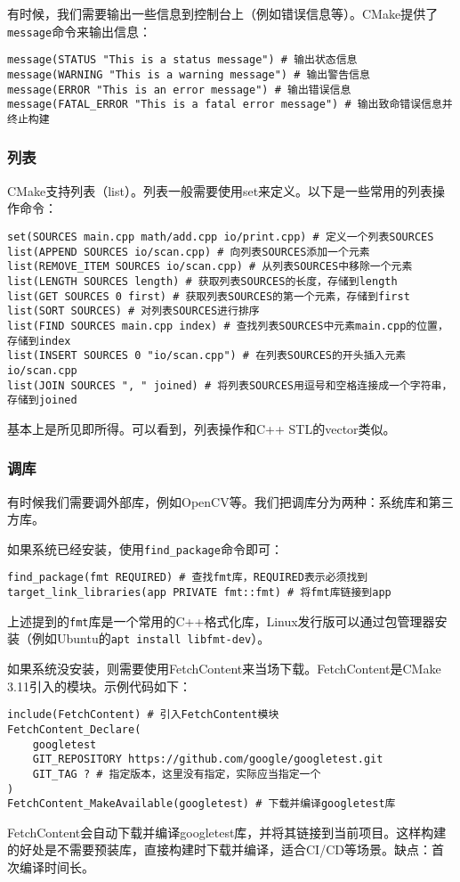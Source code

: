 \documentclass[../main.tex]{subfiles}
\begin{document}
有时候，我们需要输出一些信息到控制台上（例如错误信息等）。CMake提供了\texttt{message}命令来输出信息：
\begin{lstlisting}
message(STATUS "This is a status message") # 输出状态信息
message(WARNING "This is a warning message") # 输出警告信息
message(ERROR "This is an error message") # 输出错误信息
message(FATAL_ERROR "This is a fatal error message") # 输出致命错误信息并终止构建
\end{lstlisting}

\subsubsection{列表}

CMake支持列表（list）。列表一般需要使用set来定义。以下是一些常用的列表操作命令：
\begin{lstlisting}
set(SOURCES main.cpp math/add.cpp io/print.cpp) # 定义一个列表SOURCES
list(APPEND SOURCES io/scan.cpp) # 向列表SOURCES添加一个元素
list(REMOVE_ITEM SOURCES io/scan.cpp) # 从列表SOURCES中移除一个元素
list(LENGTH SOURCES length) # 获取列表SOURCES的长度，存储到length
list(GET SOURCES 0 first) # 获取列表SOURCES的第一个元素，存储到first
list(SORT SOURCES) # 对列表SOURCES进行排序
list(FIND SOURCES main.cpp index) # 查找列表SOURCES中元素main.cpp的位置，存储到index
list(INSERT SOURCES 0 "io/scan.cpp") # 在列表SOURCES的开头插入元素io/scan.cpp
list(JOIN SOURCES ", " joined) # 将列表SOURCES用逗号和空格连接成一个字符串，存储到joined
\end{lstlisting}

基本上是所见即所得。可以看到，列表操作和C++ STL的vector类似。

\subsubsection{调库}

有时候我们需要调外部库，例如OpenCV等。我们把调库分为两种：系统库和第三方库。

如果系统已经安装，使用\texttt{find\_package}命令即可：
\begin{lstlisting}
find_package(fmt REQUIRED) # 查找fmt库，REQUIRED表示必须找到
target_link_libraries(app PRIVATE fmt::fmt) # 将fmt库链接到app
\end{lstlisting}
上述提到的\texttt{fmt}库是一个常用的C++格式化库，Linux发行版可以通过包管理器安装（例如Ubuntu的\texttt{apt install libfmt-dev}）。

如果系统没安装，则需要使用FetchContent来当场下载。FetchContent是CMake 3.11引入的模块。示例代码如下：
\begin{lstlisting}
include(FetchContent) # 引入FetchContent模块
FetchContent_Declare(
    googletest
    GIT_REPOSITORY https://github.com/google/googletest.git
    GIT_TAG ? # 指定版本，这里没有指定，实际应当指定一个
)
FetchContent_MakeAvailable(googletest) # 下载并编译googletest库
\end{lstlisting}
FetchContent会自动下载并编译googletest库，并将其链接到当前项目。这样构建的好处是不需要预装库，直接构建时下载并编译，适合CI/CD等场景。缺点：首次编译时间长。
\end{document}
